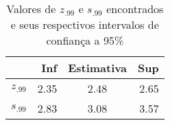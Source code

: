 \begin{table}[ht]
\centering
\begin{tabular}{rrcr}
  \hline
 & Inf & Estimativa & Sup \\ 
  \hline
$z_{.99}$ & 2.35 & 2.48 & 2.65 \\ 
  $s_{.99}$ & 2.83 & 3.08 & 3.57 \\ 
   \hline
\end{tabular}
\caption{Valores de $z_{.99}$ e $s_{.99}$ encontrados e seus
                    respectivos intervalos de confian\c ca a 95\%} 
\label{tab:tabevtAAPL2}
\end{table}

